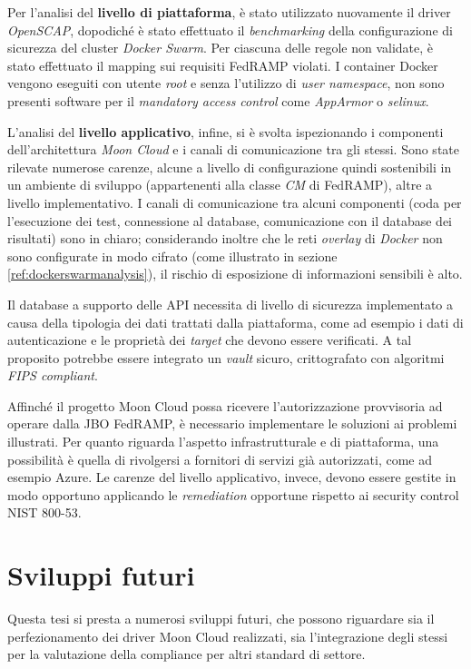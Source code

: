 \documentclass[../main.tex]{subfiles}
\begin{document}
Per l'analisi del \textbf{livello di piattaforma}, è stato utilizzato nuovamente il driver \textit{OpenSCAP}, dopodiché è stato effettuato il \textit{benchmarking} della configurazione di sicurezza del cluster \textit{Docker Swarm}. Per ciascuna delle regole non validate, è stato effettuato il mapping sui requisiti FedRAMP violati.
I container Docker vengono eseguiti con utente \textit{root} e senza l'utilizzo di \textit{user namespace}, non sono presenti software per il \textit{mandatory access control} come \textit{AppArmor} o \textit{selinux}. 
 
L'analisi del \textbf{livello applicativo}, infine, si è svolta ispezionando i componenti dell'architettura \textit{Moon Cloud} e i canali di comunicazione tra gli stessi. Sono state rilevate numerose carenze, alcune a livello di configurazione quindi sostenibili in un ambiente di sviluppo (appartenenti alla classe \textit{CM} di FedRAMP), altre a livello implementativo.
I canali di comunicazione tra alcuni componenti (coda per l'esecuzione dei test, connessione al database, comunicazione con il database dei risultati) sono in chiaro; considerando inoltre che le reti \textit{overlay} di \textit{Docker} non sono configurate in modo cifrato (come illustrato in sezione \ref{ref:dockerswarmanalysis}), il rischio di esposizione di informazioni sensibili è alto.

Il database a supporto delle API necessita di livello di sicurezza implementato a causa della tipologia dei dati trattati dalla piattaforma, come ad esempio i dati di autenticazione e le proprietà dei \textit{target} che devono essere verificati.
A tal proposito potrebbe essere integrato un \textit{vault} sicuro, crittografato con algoritmi \textit{FIPS compliant}.

Affinché il progetto Moon Cloud possa ricevere l'autorizzazione provvisoria ad operare dalla JBO FedRAMP, è necessario implementare le soluzioni ai problemi illustrati.
Per quanto riguarda l'aspetto infrastrutturale e di piattaforma, una possibilità è quella di rivolgersi a fornitori di servizi già autorizzati, come ad esempio Azure.
Le carenze del livello applicativo, invece, devono essere gestite in modo opportuno applicando le \textit{remediation} opportune rispetto ai security control NIST 800-53.

\section {Sviluppi futuri}
Questa tesi si presta a numerosi sviluppi futuri, che possono riguardare sia il perfezionamento dei driver Moon Cloud realizzati, sia l'integrazione degli stessi per la valutazione della compliance per altri standard di settore.
\end{document}
